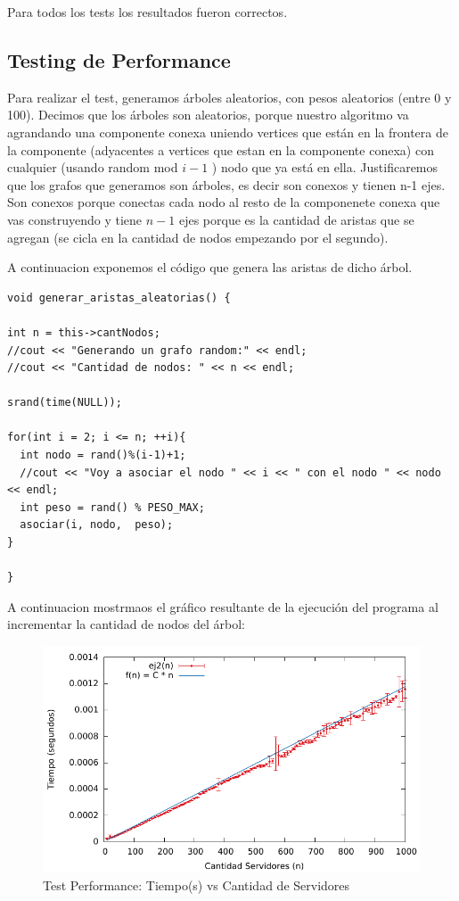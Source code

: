 Para todos los tests los resultados fueron correctos.

\subsection{Testing de Performance}

Para realizar el test, generamos árboles aleatorios, con pesos aleatorios (entre 0 y 100). Decimos que los árboles son aleatorios, porque nuestro algoritmo va agrandando una componente conexa uniendo vertices
que están en la frontera de la componente (adyacentes a vertices que estan en la componente conexa) con cualquier (usando random mod $i-1$ ) nodo que ya está en ella.
Justificaremos que los grafos que generamos son árboles, es decir son conexos y tienen n-1 ejes.
Son conexos porque conectas cada nodo al resto de la componenete conexa que vas construyendo y tiene $n-1$ ejes
porque es la cantidad de aristas que se agregan (se cicla en la cantidad de nodos empezando por el segundo).

A continuacion exponemos el código que genera las aristas de dicho árbol.

\begin{lstlisting}
void generar_aristas_aleatorias() {

int n = this->cantNodos;
//cout << "Generando un grafo random:" << endl;
//cout << "Cantidad de nodos: " << n << endl;

srand(time(NULL));

for(int i = 2; i <= n; ++i){
  int nodo = rand()%(i-1)+1;
  //cout << "Voy a asociar el nodo " << i << " con el nodo " << nodo << endl;
  int peso = rand() % PESO_MAX;
  asociar(i, nodo,  peso);
}

}
\end{lstlisting}

A continuacion mostrmaos el gráfico resultante de la ejecución del programa al incrementar la cantidad de nodos del
árbol:

\begin{figure}[H]
\centering
\includegraphics{imgs/ej2_1000_10_100.pdf}
\caption{Test Performance: Tiempo(s) vs Cantidad de Servidores}
\end{figure}

